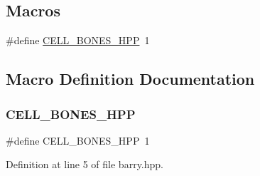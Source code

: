 \subsection*{Macros}
\begin{DoxyCompactItemize}
\item 
\#define \hyperlink{barry_8hpp_acdc5e91a788f8266c7dd182a6bf171be}{C\+E\+L\+L\+\_\+\+B\+O\+N\+E\+S\+\_\+\+H\+PP}~1
\end{DoxyCompactItemize}


\subsection{Macro Definition Documentation}
\mbox{\label{barry_8hpp_acdc5e91a788f8266c7dd182a6bf171be}} 
\subsubsection{\texorpdfstring{C\+E\+L\+L\+\_\+\+B\+O\+N\+E\+S\+\_\+\+H\+PP}{CELL\_BONES\_HPP}}
{\footnotesize\ttfamily \#define C\+E\+L\+L\+\_\+\+B\+O\+N\+E\+S\+\_\+\+H\+PP~1}



Definition at line 5 of file barry.\+hpp.

